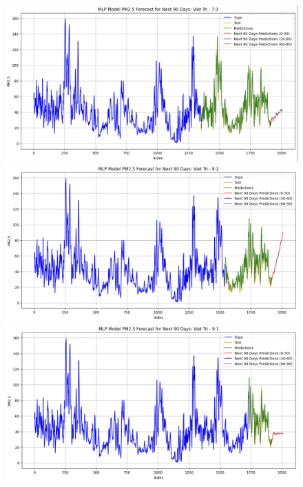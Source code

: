 \begin{figure}[H]
{\begin{adjustbox}{minipage=0.475\textwidth}
            \begin{minipage}{0.3\textwidth}
                \centering
                \includegraphics[width=\textwidth]{img/final/MLP/90D/MLP_7_3_VT.png}\\
                \includegraphics[width=\textwidth]{img/final/MLP/90D/MLP_8_2_VT.png}\\
                \includegraphics[width=\textwidth]{img/final/MLP/90D/MLP_9_1_VT.png}
            \end{minipage}
        \end{adjustbox}
}
\end{figure}
